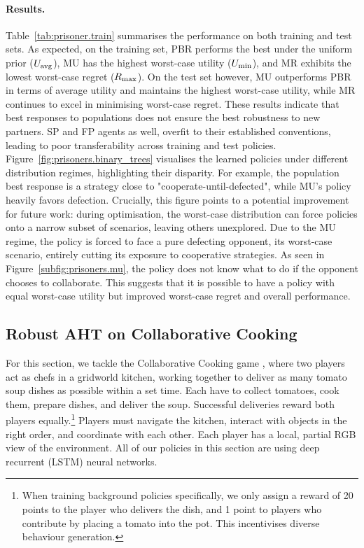 \paragraph{Results.} 
Table~\ref{tab:prisoner.train} summarises the performance on both training and test sets. As expected, on the training set, PBR performs the best under the uniform prior ($U_\text{avg}$), MU has the highest worst-case utility ($U_\text{min}$), and MR exhibits the lowest worst-case regret ($R_\text{max}$). On the test set however, MU outperforms PBR in terms of average utility and maintains the highest worst-case utility, while MR continues to excel in minimising worst-case regret. These results indicate that best responses to populations does not ensure
the best robustness to new partners. SP and FP agents as well, overfit to their established conventions, leading to poor transferability across training and test policies.
Figure~\ref{fig:prisoners.binary_trees} visualises the learned policies under different distribution regimes, highlighting their disparity. For example, the population best response is a strategy close to "cooperate-until-defected", while MU's policy heavily favors defection. 
Crucially, this figure points to a potential improvement for future work: during optimisation, the worst-case distribution can force policies onto a narrow subset of scenarios, leaving others unexplored. Due to the MU regime, the policy is forced to face a pure defecting opponent, its worst-case scenario, entirely cutting its exposure to cooperative strategies. As seen in Figure~\ref{subfig:prisoners.mu}, the policy does not know what to do if the opponent chooses to collaborate. This suggests that it is possible to have a policy with equal worst-case utility but improved worst-case regret and overall performance.




\subsection{Robust AHT on Collaborative Cooking}
\label{subsec:cooking}
For this section, we tackle the Collaborative Cooking game \citep{agapiou_melting_pot_2_2023}, where two players act as chefs in a gridworld kitchen, working together to deliver as many tomato soup dishes as possible within a set time. Each have to collect tomatoes, cook them, prepare dishes, and deliver the soup. Successful deliveries reward both players equally.\footnote{When training background policies specifically, we only assign a reward of 20 points to the player who delivers the dish, and 1 point to players who contribute by placing a tomato into the pot. This incentivises diverse behaviour generation.} Players must navigate the kitchen, interact with objects in the right order, and coordinate with each other. Each player has a local, partial RGB view of the environment. All of our policies in this section are using deep recurrent (LSTM) neural networks.


